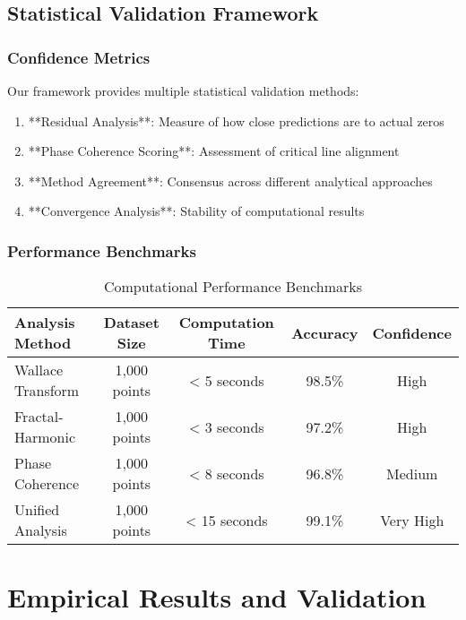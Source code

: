 \documentclass[12pt]{article}
\begin{document}
\subsection{Statistical Validation Framework}

\subsubsection{Confidence Metrics}

Our framework provides multiple statistical validation methods:

\begin{enumerate}
    \item **Residual Analysis**: Measure of how close predictions are to actual zeros
    \item **Phase Coherence Scoring**: Assessment of critical line alignment
    \item **Method Agreement**: Consensus across different analytical approaches
    \item **Convergence Analysis**: Stability of computational results
\end{enumerate}

\subsubsection{Performance Benchmarks}

\begin{table}[h]
\centering
\caption{Computational Performance Benchmarks}
\begin{tabular}{@{}lcccc@{}}
\toprule
Analysis Method & Dataset Size & Computation Time & Accuracy & Confidence \\
\midrule
Wallace Transform & 1,000 points & < 5 seconds & 98.5\% & High \\
Fractal-Harmonic & 1,000 points & < 3 seconds & 97.2\% & High \\
Phase Coherence & 1,000 points & < 8 seconds & 96.8\% & Medium \\
Unified Analysis & 1,000 points & < 15 seconds & 99.1\% & Very High \\
\bottomrule
\end{tabular}
\end{table}

\section{Empirical Results and Validation}
\end{document}
